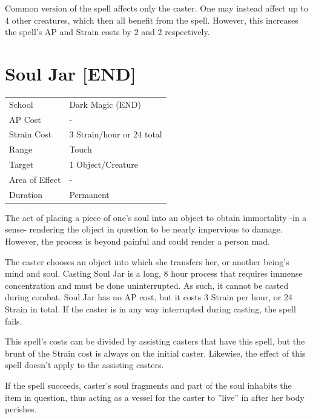 \documentclass[11pt,a4paper,twocolumn]{book}
\begin{document}
Common version of the spell affects only the caster. One may instead affect up to 4 other creatures, which then all benefit from the spell. However, this increases the spell's AP and Strain costs by 2 and 2 respectively.

\vfill


\section*{Soul Jar [END]}
{
	\begin{tabu} to 75mm{| X[l,4] | X[l,7] |}
		\hline
		School 			& Dark Magic (END) 		\\
        AP Cost	      	& - 					\\
        Strain Cost     & 3 Strain/hour or 24 total 					\\
        Range     		& Touch					\\
        Target      	& 1 Object/Creature		\\
        Area of Effect  & -  	 				\\
        Duration     	& Permanent				\\ \hline
	\end{tabu}
		
}

\medskip

The act of placing a piece of one's soul into an object to obtain immortality -in a sense- rendering the object in question to be nearly impervious to damage. However, the process is beyond painful and could render a person mad.

The caster chooses an object into which she transfers her, or another being's mind and soul. Casting Soul Jar is a long, 8 hour process that requires immense concentration and must be done uninterrupted. As such, it cannot be casted during combat. Soul Jar has no AP cost, but it costs 3 Strain per hour, or 24 Strain in total. If the caster is in any way interrupted during casting, the spell fails. 

This spell's costs can be divided by assisting casters that have this spell, but the brunt of the Strain cost is always on the initial caster. Likewise, the effect of this spell doesn't apply to the assisting casters.

If the spell succeeds, caster's soul fragments and part of the soul inhabits the item in question, thus acting as a vessel for the caster to ''live'' in after her body perishes.
\end{document}
